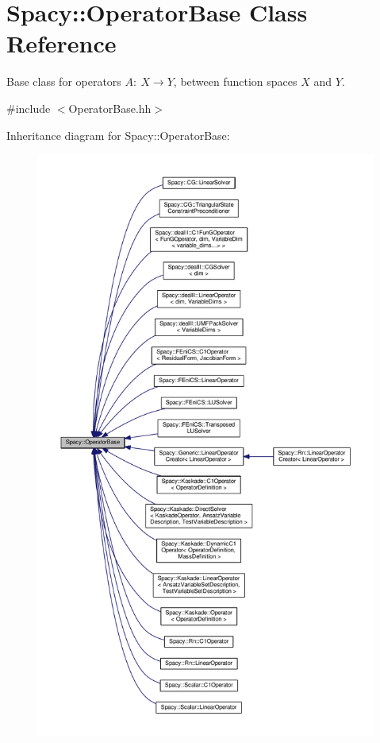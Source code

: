 \hypertarget{classSpacy_1_1OperatorBase}{\section{Spacy\-:\-:Operator\-Base Class Reference}
\label{classSpacy_1_1OperatorBase}
}


Base class for operators $A:\ X\rightarrow Y$, between function spaces $X$ and $Y$.  




{\ttfamily \#include $<$Operator\-Base.\-hh$>$}



Inheritance diagram for Spacy\-:\-:Operator\-Base\-:
\nopagebreak
\begin{figure}[H]
\begin{center}
\leavevmode
\includegraphics[height=550pt]{classSpacy_1_1OperatorBase__inherit__graph}
\end{center}
\end{figure}
